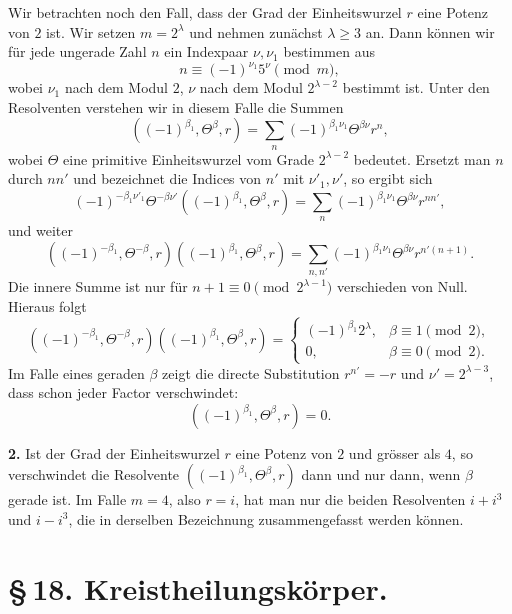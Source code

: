 \documentclass[11pt]{article}
\begin{document}
Wir betrachten noch den Fall, dass der Grad der Einheitswurzel $r$ eine Potenz von $2$ ist. Wir setzen $m=2^\lambda$ und nehmen zunächst $\lambda\geq3$ an. Dann können wir für jede ungerade Zahl $n$ ein Indexpaar $\nu,\nu_1$ bestimmen aus
\[
 n\equiv (-1)^{\nu_1}5^\nu\pmod m,
\]
wobei $\nu_1$ nach dem Modul $2$, $\nu$ nach dem Modul $2^{\lambda-2}$ bestimmt ist. Unter den Resolventen verstehen wir in diesem Falle die Summen
\begin{equation}
 ((-1)^{\beta_1},\Theta^\beta,r)=
 \sum_n (-1)^{\beta_1\nu_1}\Theta^{\beta\nu}r^n,
\tag{14}
\end{equation}
wobei $\Theta$ eine primitive Einheitswurzel vom Grade $2^{\lambda-2}$ bedeutet. Ersetzt man $n$ durch $nn'$ und bezeichnet die Indices von $n'$ mit $\nu'_1,\nu'$, so ergibt sich
\begin{equation}
 (-1)^{-\beta_1\nu'_1}\Theta^{-\beta\nu'}
 ((-1)^{\beta_1},\Theta^\beta,r)
 =\sum_n (-1)^{\beta_1\nu_1}\Theta^{\beta\nu}r^{nn'},
\tag{15}
\end{equation}
und weiter
\begin{equation}
 ((-1)^{-\beta_1},\Theta^{-\beta},r)
 ((-1)^{\beta_1},\Theta^\beta,r)
 =\sum_{n,n'}(-1)^{\beta_1\nu_1}\Theta^{\beta\nu}r^{n'(n+1)}.
\tag{16}
\end{equation}
Die innere Summe ist nur für $n+1\equiv0\pmod {2^{\lambda-1}}$ verschieden von Null. Hieraus folgt
\begin{equation}
 ((-1)^{-\beta_1},\Theta^{-\beta},r)
 ((-1)^{\beta_1},\Theta^\beta,r)=
 \begin{cases}
 (-1)^{\beta_1}2^\lambda,&\beta\equiv1\pmod2,\\
 0,&\beta\equiv0\pmod2.
 \end{cases}
\tag{17}
\end{equation}
Im Falle eines geraden $\beta$ zeigt die directe Substitution $r^{n'}=-r$ und $\nu'=2^{\lambda-3}$, dass schon jeder Factor verschwindet:
\begin{equation}
 ((-1)^{\beta_1},\Theta^\beta,r)=0.
\tag{18}
\end{equation}

\medskip
\noindent\textbf{2.} Ist der Grad der Einheitswurzel $r$ eine Potenz von $2$ und grösser als $4$, so verschwindet die Resolvente $((-1)^{\beta_1},\Theta^\beta,r)$ dann und nur dann, wenn $\beta$ gerade ist. Im Falle $m=4$, also $r=i$, hat man nur die beiden Resolventen $i+i^3$ und $i-i^3$, die in derselben Bezeichnung zusammengefasst werden können.

\section*{\S\,18. Kreistheilungskörper.}
\end{document}

